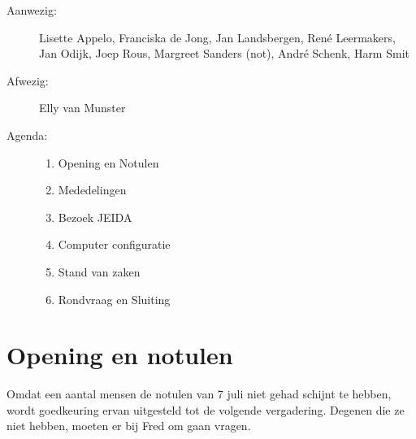 

   \RosSupersedes{-}
   \MakeRosTitle



\begin{description}
\item[Aanwezig:] Lisette Appelo, Franciska de Jong, Jan Landsbergen,
                 Ren\'{e} Leermakers, Jan Odijk, Joep Rous, 
                 Margreet Sanders (not),
                 Andr\'{e} Schenk, Harm Smit
\item[Afwezig:] Elly van Munster
\item[Agenda:]\mbox{}
  \begin{enumerate}
  \item Opening en Notulen
  \item Mededelingen
  \item Bezoek JEIDA
  \item Computer configuratie
  \item Stand van zaken
  \item Rondvraag en Sluiting
  \end{enumerate}
\end{description}

\section{Opening en notulen}
Omdat een aantal mensen de notulen van 7 juli niet gehad schijnt te hebben, 
wordt goedkeuring ervan uitgesteld tot de volgende vergadering. Degenen die ze 
niet hebben, moeten er bij Fred om gaan vragen.

